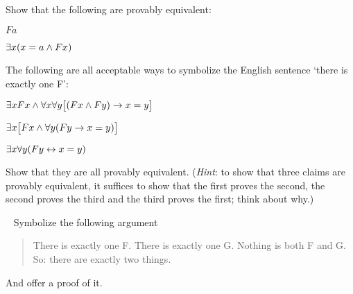 \problempart
Show that the following are provably equivalent:
\begin{ebullet}
\item $Fa$
\item $\exists x(x = a \wedge Fx)$
\end{ebullet}


\problempart
The following are all acceptable ways to symbolize the English sentence `there is exactly one F':
\begin{ebullet}
\item $\exists x Fx \wedge \forall x \forall y \bigl[(Fx \wedge Fy) \rightarrow x = y\bigr]$
\item $\exists x \bigl[Fx \wedge \forall y (Fy \rightarrow x = y)\bigr]$
\item $\exists x \forall y (Fy \leftrightarrow x = y)$
\end{ebullet}
Show that they are all provably equivalent. (\emph{Hint}: to show that three claims are provably equivalent, it suffices to show that the first proves the second, the second proves the third and the third proves the first; think about why.)


\
\problempart
Symbolize the following argument
	\begin{quote}
		There is exactly one F. There is exactly one G. Nothing is both F and G. So: there are exactly two things.%
	\end{quote}
And offer a proof of it.





